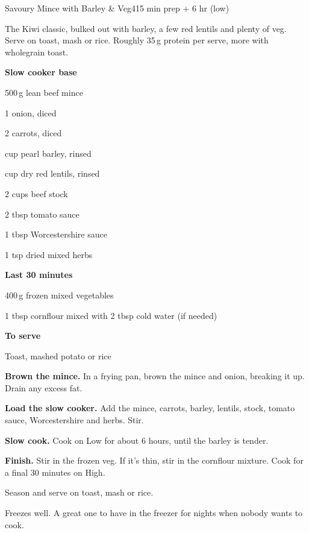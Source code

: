 \begin{recipebox}{Savoury Mince with Barley \& Veg}{4}{15 min prep + 6 hr (low)}

The Kiwi classic, bulked out with barley, a few red lentils and plenty of
veg. Serve on toast, mash or rice. Roughly 35\,g protein per serve, more with
wholegrain toast.

\begin{ingredients}
  \item[] \textbf{Slow cooker base}
  \item 500\,g lean beef mince
  \item 1 onion, diced
  \item 2 carrots, diced
  \item {} cup pearl barley, rinsed
  \item {} cup dry red lentils, rinsed
  \item 2 cups beef stock
  \item 2 tbsp tomato sauce
  \item 1 tbsp Worcestershire sauce
  \item 1 tsp dried mixed herbs
  \item[] \textbf{Last 30 minutes}
  \item 400\,g frozen mixed vegetables
  \item 1 tbsp cornflour mixed with 2 tbsp cold water (if needed)
  \item[] \textbf{To serve}
  \item Toast, mashed potato or rice
\end{ingredients}

\begin{method}
  \item \textbf{Brown the mince.} In a frying pan, brown the mince and onion, breaking it up. Drain any excess fat.
  \item \textbf{Load the slow cooker.} Add the mince, carrots, barley, lentils, stock, tomato sauce, Worcestershire and herbs. Stir.
  \item \textbf{Slow cook.} Cook on Low for about 6 hours, until the barley is tender.
  \item \textbf{Finish.} Stir in the frozen veg. If it's thin, stir in the cornflour mixture. Cook for a final 30 minutes on High.
  \item Season and serve on toast, mash or rice.
\end{method}

\begin{notelist}
  \item Freezes well. A great one to have in the freezer for nights when nobody wants to cook.
\end{notelist}

\end{recipebox}
